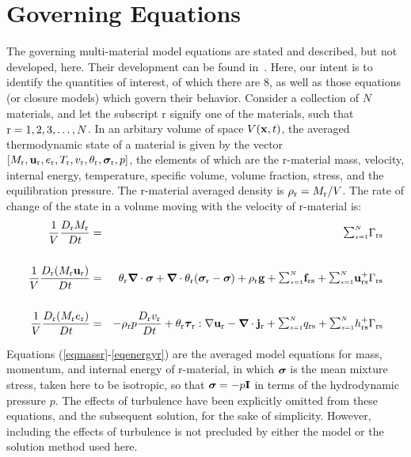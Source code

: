 \section{Governing Equations}\label{sec:governing_equations}

The governing multi-material model equations are stated and described, but
not developed, here.  Their development can be found in~\cite{kashiwa2000}.
Here, our intent is to identify the quantities of interest, of which there
are 8, as well as those equations (or closure models) which govern their
behavior.  Consider a collection of $N$ materials, and let the subscript r
signify one of the materials, such that $\rmr = 1, 2, 3, \dots, N$.  In an
arbitary volume of space $V(\bfx,t)$, the averaged thermodynamic state of a
material is given by the vector $[M_\rmr, \bfu_\rmr, e_\rmr, T_\rmr, v_\rmr,
\theta_\rmr, \sig_\rmr, p]$, the elements of which are the r-material mass,
velocity, internal energy, temperature, specific volume, volume fraction,
stress, and the equilibration pressure.  The r-material averaged density is
$\rho_\rmr = M_\rmr/V$.  The rate of change of the state in a volume moving
with the velocity of r-material is:
%
\noindent
\begin{eqnarray}
{1\over V}{D_\rmr M_\rmr \over Dt} &=&
{\raise1.5pt\hbox{$\scriptstyle\sum_{s=1}^N$}}\Gamma_{\rmr\rms}
\label{eqmassr} \\
\nonumber \\
{1\over V}{D_\rmr (M_\rmr \bfu_\rmr) \over Dt} &=&
\theta_\rmr \bnabla\cdot\sig
+\bnabla\cdot\theta_\rmr(\sig_\rmr - \sig) + \rho_\rmr\bfg
+ {\raise1.5pt\hbox{$\scriptstyle\sum_{s=1}^N$}}
\bff_{\rmr\rms} + {\raise1.5pt\hbox{$\scriptstyle\sum_{s=1}^N$}}
\bfu_{\rmr\rms}^+ \Gamma_{\rmr\rms}
\label{eqmomr}\\ \nonumber \\
{1\over V}{D_\rmr (M_\rmr e_\rmr) \over Dt} &=& -
\rho_\rmr p {D_\rmr v_\rmr\over Dt} +
\theta_\rmr\taubold_\rmr:\nabla\bfu_\rmr - \bnabla\cdot\bfj_\rmr +
{\raise1.5pt\hbox{$\scriptstyle\sum_{s=1}^N$}} q_{\rmr\rms} +
{\raise1.5pt\hbox{$\scriptstyle\sum_{s=1}^N$}}
h_{\rmr\rms}^+ \Gamma_{\rmr\rms}
\label{eqenergyr}
\end{eqnarray}

Equations (\ref{eqmassr}-\ref{eqenergyr}) are the averaged model equations
for mass, momentum, and internal energy of r-material, in which $\sig$ is
the mean mixture stress, taken here to be isotropic, so that $\sig = -p\bfI$
in terms of the hydrodynamic pressure $p$.  The effects of turbulence have
been explicitly omitted from these equations, and the subsequent solution,
for the sake of simplicity.  However, including the effects of turbulence
is not precluded by either the model or the solution method used here.


